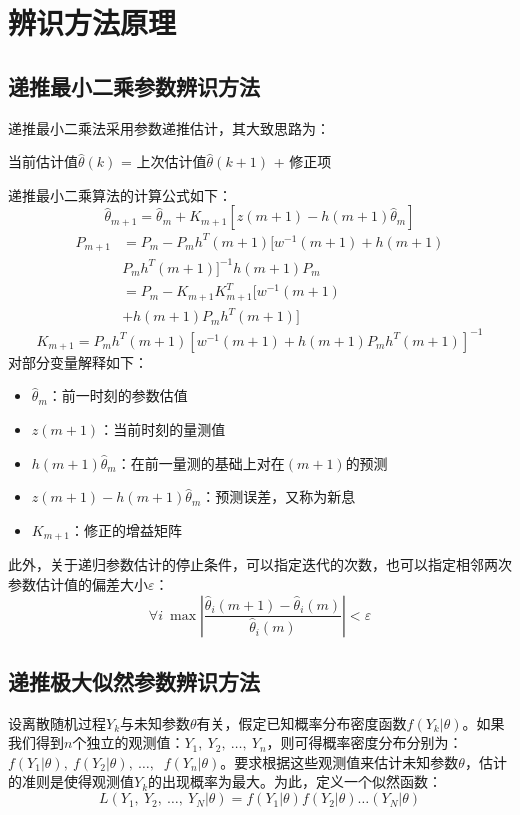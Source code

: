 \documentclass[UTF8, twocolumn]{article}
\begin{document}
%
\section{辨识方法原理}
\subsection{递推最小二乘参数辨识方法}
递推最小二乘法采用参数递推估计，其大致思路为：
\begin{center}
    当前估计值$\hat{\theta}(k)$ = 上次估计值$\hat{\theta}(k+1)$ + 修正项
\end{center}

递推最小二乘算法的计算公式如下：
\begin{equation*}
    \hat{\theta}_{m+1} = \hat{\theta}_{m} + K_{m+1}[z(m+1) - h(m+1)\hat{\theta}_m]
\end{equation*}
\begin{align*}
    P_{m+1} &= P_m - P_m h^T(m+1) [w^{-1}(m+1) + h(m+1) \\
	& P_m h^T(m+1)]^{-1} h(m+1) P_m \\
    &= P_m - K_{m+1} K_{m+1}^T[w^{-1}(m+1) \\
	& + h(m+1) P_m h^T(m+1)]
\end{align*}
\begin{equation*}
    K_{m+1} = P_m h^T(m+1) [w^{-1}(m+1) + h(m+1) P_m h^T(m+1)]^{-1}
\end{equation*}
对部分变量解释如下：
\begin{itemize}
    \item $\hat{\theta}_m$：前一时刻的参数估值
    \item $z(m+1)$：当前时刻的量测值
    \item $h(m+1) \hat{\theta}_m$：在前一量测的基础上对在$(m+1)$的预测
    \item $z(m+1) - h(m+1) \hat{\theta}_m$：预测误差，又称为新息
    \item $K_{m+1}$：修正的增益矩阵
\end{itemize}

此外，关于递归参数估计的停止条件，可以指定迭代的次数，也可以指定相邻两次参数估计值的偏差大小$\varepsilon$：
\begin{equation*}
    \forall{i} \ \max | \frac{\hat{\theta}_i(m+1) - \hat{\theta}_i(m)}{\hat{\theta}_i(m)} | < \varepsilon
\end{equation*}

\subsection{递推极大似然参数辨识方法}
设离散随机过程${Y_k}$与未知参数$\theta$有关，假定已知概率分布密度函数$f(Y_k|\theta)$。如果我们得到$n$个独立的观测值：$Y_1,\ Y_2,\ …,\ Y_n$，则可得概率密度分布分别为：$f(Y_1|\theta),\ f(Y_2|\theta),\ …,$ $\ f(Y_n|\theta)$。要求根据这些观测值来估计未知参数$\theta$，估计的准则是使得观测值${Y_k}$的出现概率为最大。为此，定义一个似然函数：
\begin{equation*}
    L(Y_1,\ Y_2,\ \dots,\ Y_N|\theta) = f(Y_1|\theta)f(Y_2|\theta)\dots(Y_N|\theta)
\end{equation*}
\end{document}
